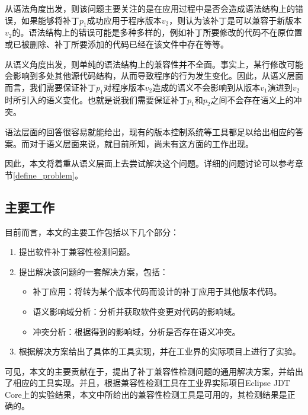 从语法角度出发，则该问题主要关注的是在应用过程中是否会造成语法结构上的错误，如果能够将补丁$p_1$成功应用于程序版本$v_2$，则认为该补丁是可以兼容于新版本$v_2$的。语法结构上的错误可能是多种多样的，例如补丁所要修改的代码不在原位置或已被删除、补丁所要添加的代码已经在该文件中存在等等。

从语义角度出发，则单纯的语法结构上的兼容性并不全面。事实上，某行修改可能会影响到多处其他源代码结构，从而导致程序的行为发生变化。因此，从语义层面而言，我们需要保证补丁$p_1$对程序版本$v_2$造成的语义不会影响到从版本$v_1$演进到$v_2$时所引入的语义变化。也就是说我们需要保证补丁$p_1$和$p_2$之间不会存在语义上的冲突。

语法层面的回答很容易就能给出，现有的版本控制系统等工具都足以给出相应的答案。而对于语义层面来说，就目前所知，尚未有这方面的工作出现。

因此，本文将着重从语义层面上去尝试解决这个问题。详细的问题讨论可以参考章节\ref {define_problem}。


\subsection{主要工作}

目前而言，本文的主要工作包括以下几个部分：
\begin{enumerate}
	\item 提出软件补丁兼容性检测问题。
	\item 提出解决该问题的一套解决方案，包括：
	\begin{itemize}
		\item 补丁应用：将转为某个版本代码而设计的补丁应用于其他版本代码。
		\item 语义影响域分析：分析并获取软件变更对代码的影响域。
		\item 冲突分析：根据得到的影响域，分析是否存在语义冲突。
	\end{itemize}
	\item 根据解决方案给出了具体的工具实现，并在工业界的实际项目上进行了实验。
\end{enumerate}

可见，本文的主要贡献在于，提出了补丁兼容性检测问题的通用解决方案，并给出了相应的工具实现。并且，根据兼容性检测工具在工业界实际项目Eclipse JDT Core上的实验结果，本文中所给出的兼容性检测工具是可用的，其检测结果是正确的。


